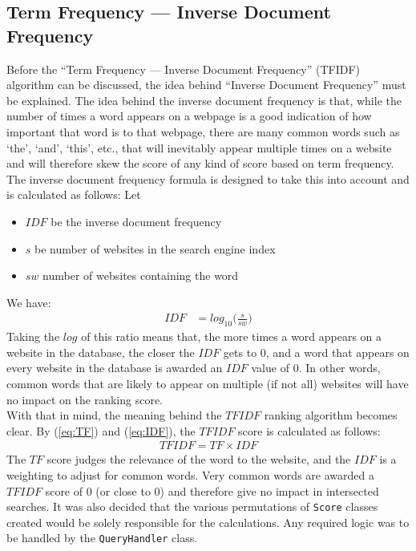 \subsection{Term Frequency — Inverse Document Frequency}
Before the ``Term Frequency — Inverse Document Frequency'' (TFIDF) algorithm can be discussed, the idea behind ``Inverse Document Frequency'' must be explained.\newline
The idea behind the inverse document frequency is that, while the number of times a word appears on a webpage is a good indication of how important that word is to that webpage, there are many common words such as `the', `and', `this', etc., that will inevitably appear multiple times on a website and will therefore skew the score of any kind of score based on term frequency.
The inverse document frequency formula is designed to take this into account and is calculated as follows:\newline
Let
\begin{itemize}
    \item $IDF$ be the inverse document frequency
    \item $s$ be number of websites in the search engine index
    \item $sw$ number of websites containing the word
\end{itemize}
We have:
\begin{align}
    IDF &= log_{10}\bigg(\frac{s}{sw}\bigg)
    \label{eq:IDF}
\end{align}
Taking the $log$ of this ratio means that, the more times a word appears on a website in the database, the closer the $IDF$ gets to $0$, and a word that appears on every website in the database is awarded an $IDF$ value of $0$.
In other words, common words that are likely to appear on multiple (if not all) websites will have no impact on the ranking score.
\\
With that in mind, the meaning behind the $TFIDF$ ranking algorithm becomes clear.
By (\ref{eq:TF}) and (\ref{eq:IDF}), the $TFIDF$ score is calculated as follows:
\begin{align*}
    TFIDF = TF \times IDF
\end{align*}
The $TF$ score judges the relevance of the word to the website, and the $IDF$ is a weighting to adjust for common words. Very common words are awarded a $TFIDF$ score of 0 (or close to 0) and therefore give no impact in intersected searches.\newline
It was also decided that the various permutations of {\tt Score} classes created would be solely responsible for the calculations. Any required logic was to be handled by the {\tt QueryHandler} class.

